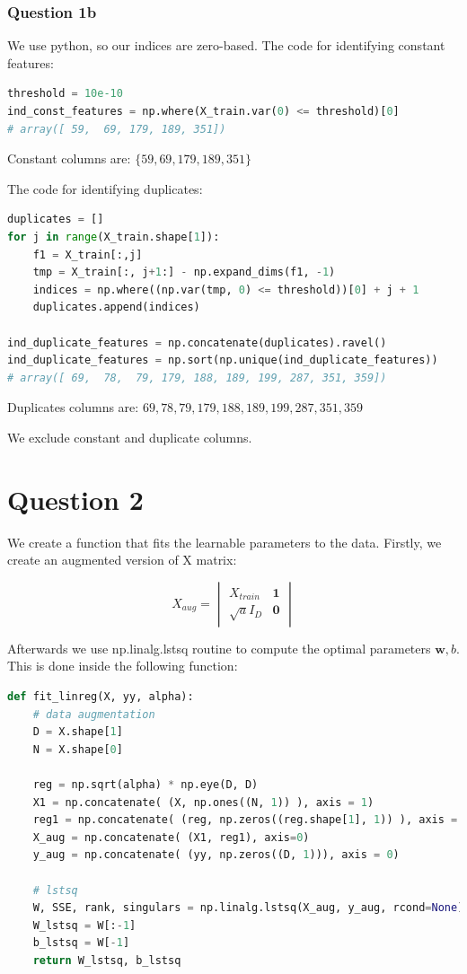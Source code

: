 \documentclass{article}
\begin{document}
\subsubsection*{Question 1b}

We use python, so our indices are zero-based. 
The code for identifying constant features:
\begin{lstlisting}[language = Python]
threshold = 10e-10
ind_const_features = np.where(X_train.var(0) <= threshold)[0]
# array([ 59,  69, 179, 189, 351])
\end{lstlisting}
Constant columns are: $\{59,  69, 179, 189, 351\}$


The code for identifying duplicates:
\begin{lstlisting}[language = Python]
duplicates = []
for j in range(X_train.shape[1]):
    f1 = X_train[:,j]
    tmp = X_train[:, j+1:] - np.expand_dims(f1, -1)
    indices = np.where((np.var(tmp, 0) <= threshold))[0] + j + 1
    duplicates.append(indices)

ind_duplicate_features = np.concatenate(duplicates).ravel()
ind_duplicate_features = np.sort(np.unique(ind_duplicate_features))
# array([ 69,  78,  79, 179, 188, 189, 199, 287, 351, 359])
\end{lstlisting}

Duplicates columns are: $ 69,  78,  79, 179, 188, 189, 199, 287, 351, 359 $

We exclude constant and duplicate columns.


\section*{Question 2}

We create a function that fits the learnable parameters to the data. Firstly, we create an augmented version of X matrix:

$$ \displaystyle
X_{aug} = \begin{vmatrix}
    X_{train} & \textbf{1} \\
    \sqrt{a}I_D & \textbf{0} 
\end{vmatrix}
$$

Afterwards we use np.linalg.lstsq routine to compute the optimal parameters $\textbf{w}, b$. This is done inside the following function:

\begin{lstlisting}[language= Python]
def fit_linreg(X, yy, alpha):
    # data augmentation
    D = X.shape[1]
    N = X.shape[0]
    
    reg = np.sqrt(alpha) * np.eye(D, D)
    X1 = np.concatenate( (X, np.ones((N, 1)) ), axis = 1)
    reg1 = np.concatenate( (reg, np.zeros((reg.shape[1], 1)) ), axis = 1)
    X_aug = np.concatenate( (X1, reg1), axis=0)
    y_aug = np.concatenate( (yy, np.zeros((D, 1))), axis = 0)

    # lstsq
    W, SSE, rank, singulars = np.linalg.lstsq(X_aug, y_aug, rcond=None)
    W_lstsq = W[:-1]
    b_lstsq = W[-1]
    return W_lstsq, b_lstsq
\end{lstlisting}
\end{document}
